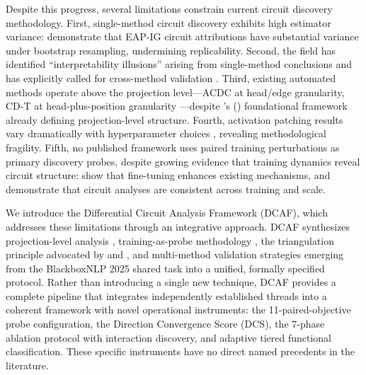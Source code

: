 \documentclass[11pt]{article}
\begin{document}
Despite this progress, several limitations constrain current circuit discovery methodology. First, single-method circuit discovery exhibits high estimator variance: \citet{meloux2025variance} demonstrate that EAP-IG circuit attributions have substantial variance under bootstrap resampling, undermining replicability. Second, the field has identified ``interpretability illusions'' arising from single-method conclusions and has explicitly called for cross-method validation \citep{sharkey2025openproblems}. Third, existing automated methods operate above the projection level---ACDC at head/edge granularity, CD-T at head-plus-position granularity \citep{hsu2025cdt}---despite \citeauthor{elhage2021mathematical}'s (\citeyear{elhage2021mathematical}) foundational framework already defining projection-level structure. Fourth, activation patching results vary dramatically with hyperparameter choices \citep{zhang2024bestpractices}, revealing methodological fragility. Fifth, no published framework uses paired training perturbations as primary discovery probes, despite growing evidence that training dynamics reveal circuit structure: \citet{prakash2024finetuning} show that fine-tuning enhances existing mechanisms, and \citet{tigges2024consistent} demonstrate that circuit analyses are consistent across training and scale.

We introduce the Differential Circuit Analysis Framework (DCAF), which addresses these limitations through an integrative approach. DCAF synthesizes projection-level analysis \citep{elhage2021mathematical}, training-as-probe methodology \citep{prakash2024finetuning,tigges2024consistent}, the triangulation principle advocated by \citet{long2025triangulation} and \citet{sharkey2025openproblems}, and multi-method validation strategies emerging from the BlackboxNLP 2025 shared task \citep{mondorf2025ensemble} into a unified, formally specified protocol. Rather than introducing a single new technique, DCAF provides a complete pipeline that integrates independently established threads into a coherent framework with novel operational instruments: the 11-paired-objective probe configuration, the Direction Convergence Score (DCS), the 7-phase ablation protocol with interaction discovery, and adaptive tiered functional classification. These specific instruments have no direct named precedents in the literature.
\end{document}
